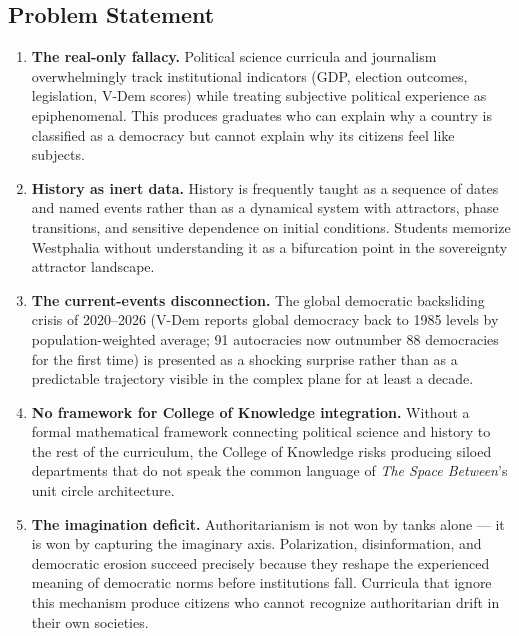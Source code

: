 \documentclass[11pt,letterpaper]{article}
\begin{document}
\subsection{Problem Statement}

\begin{enumerate}
  \item \textbf{The real-only fallacy.} Political science curricula and journalism overwhelmingly track institutional indicators (GDP, election outcomes, legislation, V-Dem scores) while treating subjective political experience as epiphenomenal. This produces graduates who can explain why a country is classified as a democracy but cannot explain why its citizens feel like subjects.

  \item \textbf{History as inert data.} History is frequently taught as a sequence of dates and named events rather than as a dynamical system with attractors, phase transitions, and sensitive dependence on initial conditions. Students memorize Westphalia without understanding it as a bifurcation point in the sovereignty attractor landscape.

  \item \textbf{The current-events disconnection.} The global democratic backsliding crisis of 2020--2026 (V-Dem reports global democracy back to 1985 levels by population-weighted average; 91 autocracies now outnumber 88 democracies for the first time) is presented as a shocking surprise rather than as a predictable trajectory visible in the complex plane for at least a decade.

  \item \textbf{No framework for College of Knowledge integration.} Without a formal mathematical framework connecting political science and history to the rest of the curriculum, the College of Knowledge risks producing siloed departments that do not speak the common language of \textit{The Space Between}'s unit circle architecture.

  \item \textbf{The imagination deficit.} Authoritarianism is not won by tanks alone --- it is won by capturing the imaginary axis. Polarization, disinformation, and democratic erosion succeed precisely because they reshape the experienced meaning of democratic norms before institutions fall. Curricula that ignore this mechanism produce citizens who cannot recognize authoritarian drift in their own societies.
\end{enumerate}
\end{document}

